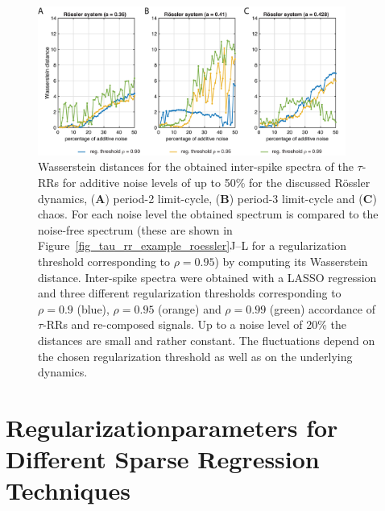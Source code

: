 \documentclass[entropy,article,accept,pdftex,moreauthors]{Definitions/mdpi}
\begin{document}
\vspace{-6pt}

\begin{figure}[H]
 \includegraphics[width=0.9\textwidth]{./figures/fig_roessler_spectra_distances}
 \caption{Wasserstein distances for the obtained inter-spike spectra of the $\tau$-RRs for additive noise levels of up to 50\% for the discussed R\"ossler dynamics, 
 (\textbf{A}) period-2 limit-cycle, (\textbf{B}) period-3 limit-cycle and (\textbf{C}) chaos. For each noise level the obtained spectrum is compared to the noise-free spectrum (these are shown 
 in Figure~\ref{fig_tau_rr_example_roessler}J--L for a regularization threshold corresponding to $\rho=0.95$) by computing its Wasserstein distance. Inter-spike spectra were obtained with a 
 LASSO regression and three different regularization thresholds corresponding to $\rho=0.9$ (blue), $\rho=0.95$ (orange) and $\rho=0.99$ (green) accordance of $\tau$-RRs and re-composed signals. 
 Up to a noise level of 20\% the distances are small and rather constant. The fluctuations depend on the chosen regularization threshold as well as on the underlying dynamics.}
\label{fig_roessler_spectra_distances}
\end{figure}

\section{Regularizationparameters for Different Sparse Regression Techniques}\label{sec_regularization_appendix}
\end{document}
